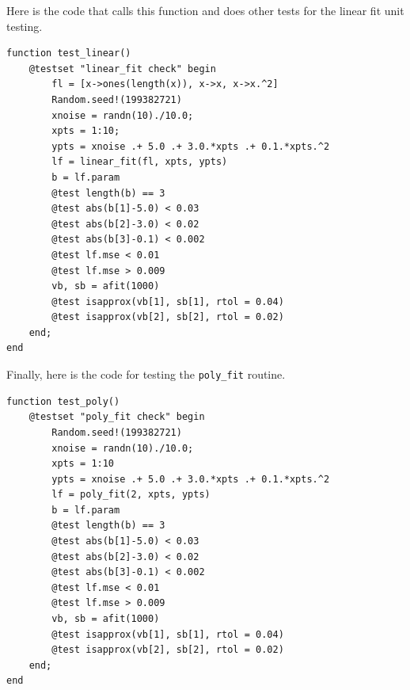 \documentclass{scrartcl}
\begin{document}
Here is the code that calls this function and does other
tests for the linear fit unit testing.
\begin{lstlisting}
function test_linear()
    @testset "linear_fit check" begin
        fl = [x->ones(length(x)), x->x, x->x.^2]
        Random.seed!(199382721)
        xnoise = randn(10)./10.0;
        xpts = 1:10;
        ypts = xnoise .+ 5.0 .+ 3.0.*xpts .+ 0.1.*xpts.^2
        lf = linear_fit(fl, xpts, ypts)
        b = lf.param
        @test length(b) == 3
        @test abs(b[1]-5.0) < 0.03
        @test abs(b[2]-3.0) < 0.02
        @test abs(b[3]-0.1) < 0.002
        @test lf.mse < 0.01
        @test lf.mse > 0.009
        vb, sb = afit(1000)
        @test isapprox(vb[1], sb[1], rtol = 0.04)
        @test isapprox(vb[2], sb[2], rtol = 0.02)
    end;
end
\end{lstlisting}
Finally, here is the code for testing the \texttt{poly\_fit}
routine.
\begin{lstlisting}
function test_poly()
    @testset "poly_fit check" begin
        Random.seed!(199382721)
        xnoise = randn(10)./10.0;
        xpts = 1:10
        ypts = xnoise .+ 5.0 .+ 3.0.*xpts .+ 0.1.*xpts.^2
        lf = poly_fit(2, xpts, ypts)
        b = lf.param
        @test length(b) == 3
        @test abs(b[1]-5.0) < 0.03
        @test abs(b[2]-3.0) < 0.02
        @test abs(b[3]-0.1) < 0.002
        @test lf.mse < 0.01
        @test lf.mse > 0.009
        vb, sb = afit(1000)
        @test isapprox(vb[1], sb[1], rtol = 0.04)
        @test isapprox(vb[2], sb[2], rtol = 0.02)
    end;
end
\end{lstlisting}
\end{document}
